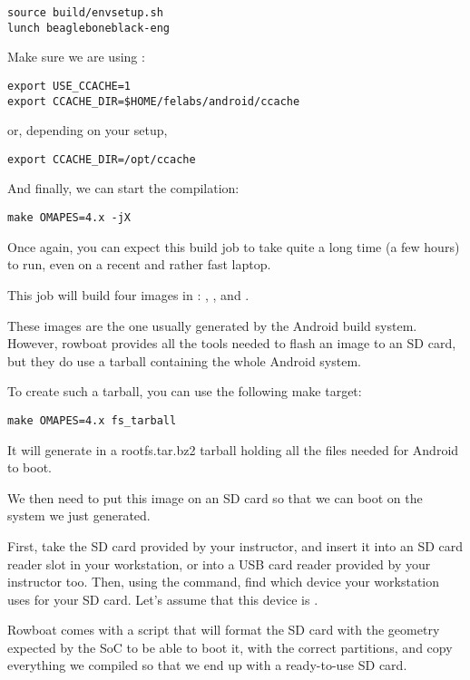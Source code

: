 \begin{verbatim}
source build/envsetup.sh
lunch beagleboneblack-eng
\end{verbatim}

Make sure we are using :

\begin{verbatim}
export USE_CCACHE=1
export CCACHE_DIR=$HOME/felabs/android/ccache
\end{verbatim}
or, depending on your setup,
\begin{verbatim}
export CCACHE_DIR=/opt/ccache
\end{verbatim}

And finally, we can start the compilation:

\begin{verbatim}
make OMAPES=4.x -jX
\end{verbatim}

Once again, you can expect this build job to take quite a long time (a
few hours) to run, even on a recent and rather fast laptop.

This job will build four images in
: ,
,  and .

These images are the one usually generated by the Android build
system. However, rowboat provides all the tools needed to flash an
image to an SD card, but they do use a tarball containing the whole
Android system.

To create such a tarball, you can use the following make target:

\begin{verbatim}
make OMAPES=4.x fs_tarball
\end{verbatim}

It will generate in  a
rootfs.tar.bz2 tarball holding all the files needed for Android to
boot.

We then need to put this image on an SD card so that we can boot on
the system we just generated.

First, take the SD card provided by your instructor, and insert it
into an SD card reader slot in your workstation, or into a USB card
reader provided by your instructor too. Then, using the 
command, find which device your workstation uses for your SD card.
Let's assume that this device is .

Rowboat comes with a script that will format the SD card with the
geometry expected by the SoC to be able to boot it, with the correct
partitions, and copy everything we compiled so that we end up with a
ready-to-use SD card.

